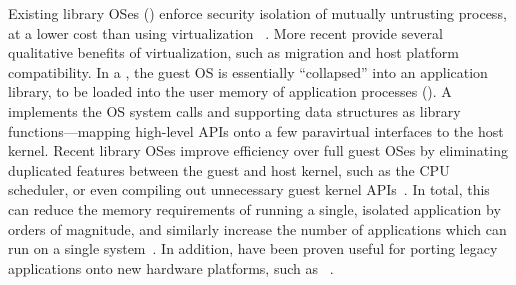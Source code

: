 Existing library OSes (\libos{}) enforce security isolation of mutually untrusting process,
at a lower cost than using virtualization
~\citep{porter11drawbridge,unikernels,baumann13bascule}.
More recent \liboses{}
provide several qualitative benefits of virtualization,
such as migration and host platform compatibility.
In a \libos{}, the guest OS is essentially ``collapsed''
into an application library, to be loaded into the user memory of application processes ({\em \picoprocs{}}).
A \libos{} implements the OS system calls and supporting data structures as library functions---mapping
high-level APIs onto
a few paravirtual interfaces to the host kernel.
Recent library OSes improve efficiency over full guest OSes by eliminating duplicated features
between the guest and host kernel,
such as the CPU scheduler, or
even compiling out unnecessary guest kernel APIs~\citep{unikernels}.
In total, this can reduce the memory requirements of running a single, isolated application
by orders of magnitude, and similarly
increase the number of applications which can run
on a single system~\citep{porter11drawbridge,unikernels}.
In addition, \liboses{} have been proven
useful for porting legacy applications
onto new hardware platforms, such as \intel{} \sgx{}~\citep{baumann14haven}.



